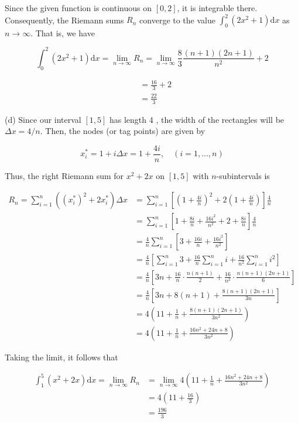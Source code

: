\documentclass[10pt]{article}
\begin{document}
Since the given function is continuous on $[0,2]$, it is integrable there. Consequently, the Riemann sums $R_{n}$ converge to the value $\int_{0}^{2}\left(2 x^{2}+1\right) \mathrm{d} x$ as $n \rightarrow \infty$. That is, we have

$$
\int_{0}^{2}\left(2 x^{2}+1\right) \mathrm{d} x=\lim _{n \rightarrow \infty} R_{n}=\lim _{n \rightarrow \infty} \frac{8}{3} \frac{(n+1)(2 n+1)}{n^{2}}+2
$$

$$
\begin{aligned}
& =\frac{16}{3}+2 \\
& =\frac{22}{3}
\end{aligned}
$$

(d) Since our interval $[1,5]$ has length 4 , the width of the rectangles will be $\Delta x=4 / n$. Then, the nodes (or tag points) are given by

$$
x_{i}^{*}=1+i \Delta x=1+\frac{4 i}{n}, \quad(i=1, \ldots, n)
$$

Thus, the right Riemann sum for $x^{2}+2 x$ on $[1,5]$ with $n$-subintervals is

$$
\begin{aligned}
R_{n}=\sum_{i=1}^{n}\left(\left(x_{i}^{*}\right)^{2}+2 x_{i}^{*}\right) \Delta x & =\sum_{i=1}^{n}\left[\left(1+\frac{4 i}{n}\right)^{2}+2\left(1+\frac{4 i}{n}\right)\right] \frac{4}{n} \\
& =\sum_{i=1}^{n}\left[1+\frac{8 i}{n}+\frac{16 i^{2}}{n^{2}}+2+\frac{8 i}{n}\right] \frac{4}{n} \\
& =\frac{4}{n} \sum_{i=1}^{n}\left[3+\frac{16 i}{n}+\frac{16 i^{2}}{n^{2}}\right] \\
& =\frac{4}{n}\left[\sum_{i=1}^{n} 3+\frac{16}{n} \sum_{i=1}^{n} i+\frac{16}{n^{2}} \sum_{i=1}^{n} i^{2}\right] \\
& =\frac{4}{n}\left[3 n+\frac{16}{n} \cdot \frac{n(n+1)}{2}+\frac{16}{n^{2}} \cdot \frac{n(n+1)(2 n+1)}{6}\right] \\
& =\frac{4}{n}\left[3 n+8(n+1)+\frac{8(n+1)(2 n+1)}{3 n}\right] \\
& =4\left(11+\frac{1}{n}+\frac{8(n+1)(2 n+1)}{3 n^{2}}\right) \\
& =4\left(11+\frac{1}{n}+\frac{16 n^{2}+24 n+8}{3 n^{2}}\right)
\end{aligned}
$$

Taking the limit, it follows that

$$
\begin{aligned}
\int_{1}^{5}\left(x^{2}+2 x\right) \mathrm{d} x=\lim _{n \rightarrow \infty} R_{n} & =\lim _{n \rightarrow \infty} 4\left(11+\frac{1}{n}+\frac{16 n^{2}+24 n+8}{3 n^{2}}\right) \\
& =4\left(11+\frac{16}{3}\right) \\
& =\frac{196}{3}
\end{aligned}
$$
\end{document}
